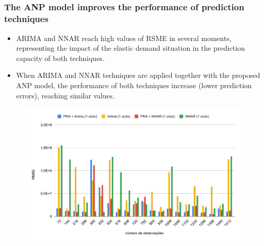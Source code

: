 \documentclass[aspectratio=169]{beamer}
\begin{document}
\subsection{}
\begin{frame}
\frametitle{The ANP model improves the performance of prediction techniques}
\small

\begin{itemize}\footnotesize
 \item ARIMA and NNAR reach high values of RSME in several moments, representing the impact of the elastic demand situation in the prediction capacity of both techniques.
 \item When ARIMA and NNAR techniques are applied together with the proposed ANP model, the performance of both techniques increase (lower prediction errors), reaching similar values.
\end{itemize}

\vspace{-0.2cm}

\centering
\begin{figure}[!htb]
\centering
\includegraphics[height=0.37\textwidth,angle=0]{rmse_PRA_original_juntos-eps-converted-to.pdf}
\end{figure}

\end{frame}

\end{document}
